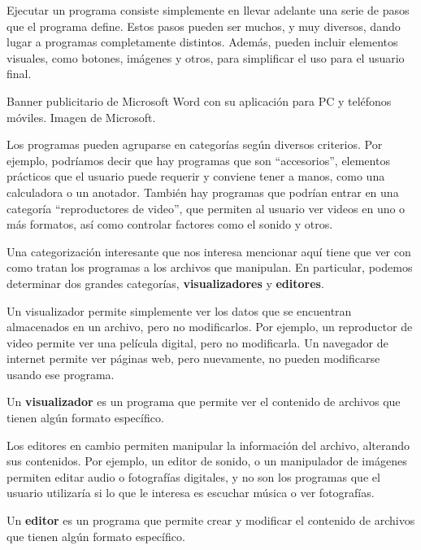 Ejecutar un programa consiste simplemente en llevar adelante una serie de pasos
que el programa define. Estos pasos pueden ser muchos, y muy diversos, dando lugar
a programas completamente distintos. Además, pueden incluir elementos visuales, como
botones, imágenes y otros, para simplificar el uso para el usuario final.

{Banner publicitario de Microsoft Word con su aplicación para PC y teléfonos móviles.}
{Imagen de Microsoft.}

Los programas pueden agruparse en categorías según diversos criterios. Por ejemplo,
podríamos decir que hay programas que son ``accesorios'', elementos prácticos que
el usuario puede requerir y conviene tener a manos, como una calculadora o un anotador.
También hay programas que podrían entrar en una categoría ``reproductores de video'',
que permiten al usuario ver videos en uno o más formatos, así como controlar
factores como el sonido y otros.

Una categorización interesante que nos interesa mencionar aquí tiene que ver con
como tratan los programas a los archivos que manipulan. En particular, podemos
determinar dos grandes categorías, \textbf{visualizadores} y \textbf{editores}.

Un visualizador permite simplemente ver los datos que se encuentran almacenados
en un archivo, pero no modificarlos. Por ejemplo, un reproductor de video permite
ver una película digital, pero no modificarla. Un navegador de internet permite
ver páginas web, pero nuevamente, no pueden modificarse usando ese programa.

\begin{definition}
    Un \textbf{visualizador} es un programa que permite ver el contenido de
    archivos que tienen algún formato específico.
\end{definition}

Los editores en cambio permiten manipular la información del archivo, alterando
sus contenidos. Por ejemplo, un editor de sonido, o un manipulador de imágenes
permiten editar audio o fotografías digitales, y no son los programas que el
usuario utilizaría si lo que le interesa es escuchar música o ver fotografías.

\begin{definition}
    Un \textbf{editor} es un programa que permite crear y modificar el contenido
    de archivos que tienen algún formato específico.
\end{definition}

